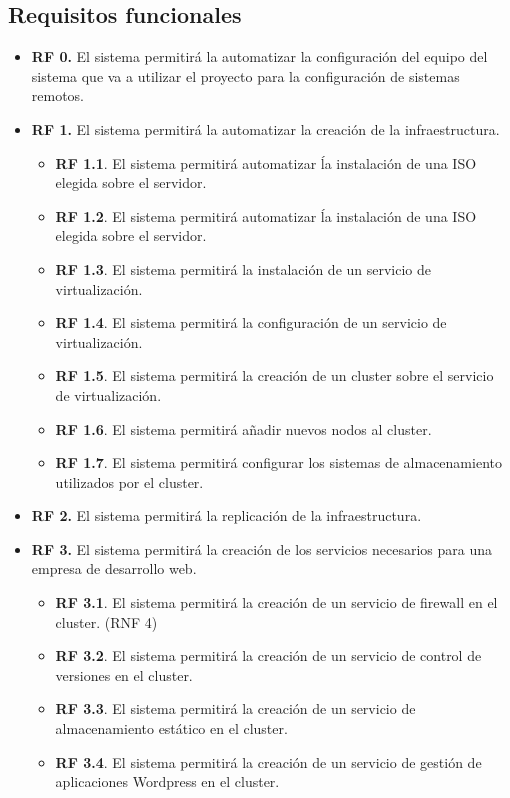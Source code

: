 	\subsection{Requisitos funcionales}
	\begin{itemize}
		\item \textbf{RF 0.} El sistema permitirá la automatizar la configuración del equipo del sistema que va a utilizar el proyecto para la configuración de sistemas remotos.
		\item \textbf{RF 1.} El sistema permitirá la automatizar la creación de la infraestructura.
		\begin{itemize}
			\item \textbf{RF 1.1}. El sistema permitirá automatizar ĺa instalación de una ISO elegida sobre el servidor.
			\item \textbf{RF 1.2}. El sistema permitirá automatizar ĺa instalación de una ISO elegida sobre el servidor.
			\item \textbf{RF 1.3}. El sistema permitirá la instalación de un servicio de virtualización. 
			\item \textbf{RF 1.4}. El sistema permitirá la configuración de un servicio de virtualización.
			\item \textbf{RF 1.5}. El sistema permitirá la creación de un cluster sobre el servicio de virtualización.
			\item \textbf{RF 1.6}. El sistema permitirá añadir nuevos nodos al cluster.
			\item \textbf{RF 1.7}. El sistema permitirá configurar los sistemas de almacenamiento utilizados por el cluster.
		\end{itemize}
		\item \textbf{RF 2.} El sistema permitirá la replicación de la infraestructura.
		\item \textbf{RF 3.} El sistema permitirá la creación de los servicios necesarios para una empresa de desarrollo web.
		\begin{itemize}
			\item \textbf{RF 3.1}. El sistema permitirá la creación de un servicio de firewall en el cluster. (RNF 4)
			\item \textbf{RF 3.2}. El sistema permitirá la creación de un servicio de control de versiones en el cluster.
			\item \textbf{RF 3.3}. El sistema permitirá la creación de un servicio de almacenamiento estático en el cluster.
			\item \textbf{RF 3.4}. El sistema permitirá la creación de un servicio de gestión de aplicaciones Wordpress en el cluster.

\end{itemize}
\end{itemize}
